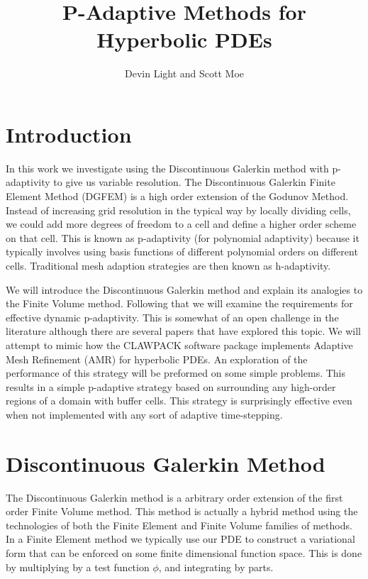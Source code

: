 \documentclass[10]{amsart}
\title[]{P-Adaptive Methods for Hyperbolic PDEs}
\author{Devin Light and Scott Moe}
\begin{document}
\maketitle

\section{Introduction}

In this work we investigate using the Discontinuous Galerkin method with p-adaptivity to give us variable resolution.
The Discontinuous Galerkin Finite Element Method (DGFEM) is a high order
extension of the Godunov Method. Instead of increasing grid resolution in the typical way by locally dividing cells, 
we could add more
degrees of freedom to a cell and define a higher order scheme on that cell. This is known as p-adaptivity
(for polynomial adaptivity) because it typically involves using basis functions of different polynomial orders on different
cells. Traditional mesh adaption strategies are then known as h-adaptivity. 

We will introduce the Discontinuous Galerkin method and explain its analogies to the Finite Volume method. Following that
we will examine the requirements for effective dynamic p-adaptivity. This is somewhat of an open challenge in the literature
although there are several papers that have explored this topic. We will attempt to mimic how the 
CLAWPACK software package implements
Adaptive Mesh Refinement (AMR) for hyperbolic PDEs. An exploration of the performance of this strategy
will be preformed on some simple problems. This 
results in a simple p-adaptive strategy based on surrounding any high-order
regions of a domain with buffer cells. This strategy is surprisingly effective even when not implemented
with any sort of adaptive time-stepping.

\section{Discontinuous Galerkin Method}

The Discontinuous Galerkin method is a arbitrary order extension of the first order Finite Volume method.
This method is actually a hybrid method using the technologies of both the Finite Element and Finite
Volume families of methods. In a Finite Element method we typically use our PDE to construct a variational
form that can be enforced on some finite dimensional function space. This is done by multiplying by a test function $\phi$,
and integrating by parts.
\end{document}
